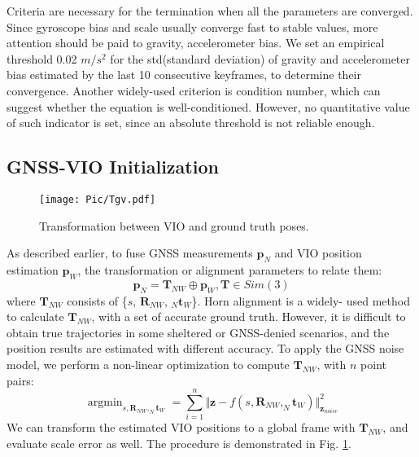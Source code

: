 \documentclass[journal,article,submit,moreauthors,pdftex]{Definitions/mdpi}
\begin{document}
Criteria are necessary for the termination when all the parameters 
are converged.
Since gyroscope bias and scale usually converge fast to stable values, 
more attention should be paid to gravity, accelerometer bias.
We set an empirical threshold 0.02 $m/s^2$ for the std(standard deviation) of 
gravity and accelerometer bias estimated by the last 10 consecutive keyframes, 
to determine their convergence.
Another widely-used criterion is condition number, which can suggest 
whether the equation is well-conditioned.
However, no quantitative value of such indicator is set, since an 
absolute threshold is not reliable enough\cite{mur-artalVisualInertialMonocularSLAM2017a}.


\subsection{GNSS-VIO Initialization}
\begin{figure}[H]
	\centering
	\texttt{[image: Pic/Tgv.pdf]}
	\caption{Transformation between VIO and ground truth poses.}
	\label{Transformation}
\end{figure} 
As described earlier, to fuse GNSS measurements $\boldsymbol{p}_{N}$ 
and VIO position estimation $\boldsymbol{p}_{W}$, the transformation 
or alignment parameters to relate them:
\begin{equation}
	\boldsymbol{p}_N = \boldsymbol{T}_{NW} \oplus  \boldsymbol{p}_{W}, \boldsymbol{T} \in Sim(3)
\end{equation}
where $\boldsymbol{T}_{NW}$ consists of \{$s$, $\boldsymbol{R}_{NW}$, 
$_N\boldsymbol{t}_{W}$\}.
Horn alignment \cite{hornClosedformSolutionAbsolute1987} is a widely-
used method to calculate $\boldsymbol{T}_{NW}$, with a set of accurate 
ground truth.
However, it is difficult to obtain true trajectories in some sheltered 
or GNSS-denied scenarios, and the position results are estimated with 
different accuracy.
To apply the GNSS noise model, we perform a non-linear optimization to 
compute $\boldsymbol{T}_{NW}$, with $n$ point pairs:
\begin{equation}
	\mathop{\arg\min}_{s,\boldsymbol{R}_{NW}, _N\boldsymbol{t}_{W}} = 
	\sum_{i=1}^{n}\Vert \boldsymbol{z} - f(s,\boldsymbol{R}_{NW}, _N\boldsymbol{t}_{W}) 
	\Vert^2_{\boldsymbol{z}_{noise}}
\end{equation}
We can transform the estimated VIO positions to a global frame with 
$\boldsymbol{T}_{NW}$, and evaluate scale error as well.
The procedure is demonstrated in Fig. \ref{Transformation}.
\end{document}
